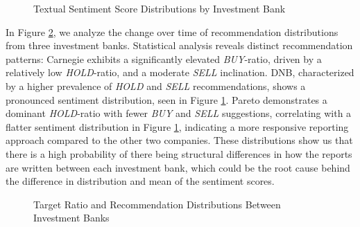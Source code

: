 \begin{figure}[H]
    \centering
    \caption{Textual Sentiment Score Distributions by Investment Bank}
    \label{fig:sentdist}
\end{figure}


In Figure \ref{fig:reccomendationstime}, we analyze the change over time of recommendation distributions from three investment banks. Statistical analysis reveals distinct recommendation patterns: Carnegie exhibits a significantly elevated \textit{BUY}-ratio, driven by a relatively low \textit{HOLD}-ratio, and a moderate \textit{SELL} inclination. DNB, characterized by a higher prevalence of \textit{HOLD} and \textit{SELL} recommendations, shows a pronounced sentiment distribution, seen in Figure \ref{fig:sentdist}. Pareto demonstrates a dominant \textit{HOLD}-ratio with fewer \textit{BUY} and \textit{SELL} suggestions, correlating with a flatter sentiment distribution in Figure \ref{fig:sentdist}, indicating a more responsive reporting approach compared to the other two companies. These distributions show us that there is a high probability of there being structural differences in how the reports are written between each investment bank, which could be the root cause behind the difference in distribution and mean of the sentiment scores.

\begin{figure}[H]
        \centering
        
        \caption{Target Ratio and Recommendation Distributions Between Investment Banks}
        \label{fig:reccomendationstime}
    \end{figure}


